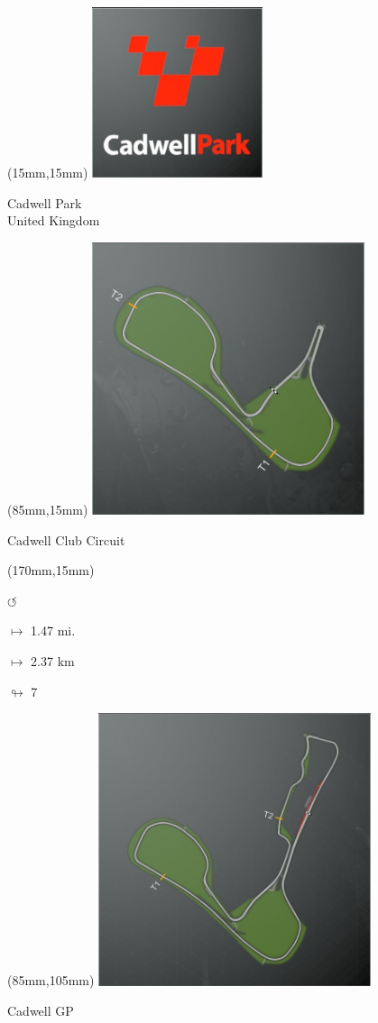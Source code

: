 \begin{textblock*}{60mm}(15mm,15mm)%
\includegraphics[width=50mm]{LG/2015-05-20_00076.png}
\par Cadwell Park\\ United Kingdom
\end{textblock*}
\begin{textblock*}{80mm}(85mm,15mm)%
\includegraphics[width=80mm]{TR/2015-05-20_00011.png}
\centerline{Cadwell Club Circuit}
\end{textblock*}
\begin{textblock*}{30mm}(170mm,15mm)%
\par \Huge$\circlearrowleft$
\Large
\par$\mapsto$ 1.47 mi.
\par$\mapsto$ 2.37 km
\par$\looparrowright$ 7
\end{textblock*}
\begin{textblock*}{80mm}(85mm,105mm)%
\includegraphics[width=80mm]{TR/2015-05-20_00010.png}
\centerline{Cadwell GP}
\end{textblock*}
